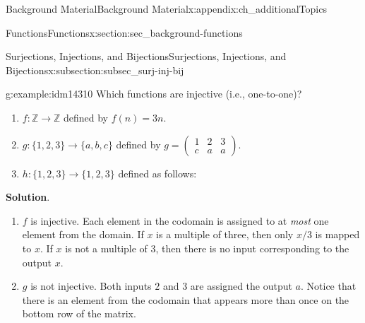 \documentclass[oneside,10pt,]{book}
\numberwithin{equation}{chapter}
\def\Z{\mathbb Z}
\newcommand{\amp}{&}
\begin{document}
\begin{appendixptx}{Background Material}{}{Background Material}{}{}{x:appendix:ch_additionalTopics}
\begin{sectionptx}{Functions}{}{Functions}{}{}{x:section:sec_background-functions}
\begin{subsectionptx}{Surjections, Injections, and Bijections}{}{Surjections, Injections, and Bijections}{}{}{x:subsection:subsec_surj-inj-bij}
\begin{sidebyside}{2}{0.05}{0.05}{0.1}
\begin{sbspanel}{0.4}%
%
\end{sbspanel}%
\end{sidebyside}%
\begin{example}{}{g:example:idm14310}%
Which functions are injective (i.e., one-to-one)?%
\par
%
\begin{enumerate}
\item{}\(f:\Z \to \Z\) defined by \(f(n) = 3n\).%
\item{}\(g: \{1,2,3\} \to \{a,b,c\}\) defined by \(g = \begin{pmatrix}1 \amp 2 \amp 3 \\ c \amp a \amp a \end{pmatrix}\).%
\item{}\(h:\{1,2,3\} \to \{1,2,3\}\) defined as follows:%
\begin{sidebyside}{1}{0.4}{0.4}{0}%
\begin{sbspanel}{0.2}%
%
\end{sbspanel}%
\end{sidebyside}%
\end{enumerate}
%
\par\smallskip%
\noindent\textbf{Solution}.\hypertarget{g:solution:idm14327}{}\quad{}%
\begin{enumerate}
\item{}\(f\) is injective. Each element in the codomain is assigned to at \emph{most} one element from the domain. If \(x\) is a multiple of three, then only \(x/3\) is mapped to \(x\). If \(x\) is not a multiple of 3, then there is no input corresponding to the output \(x\).%
\item{}\(g\) is not injective. Both inputs \(2\) and \(3\) are assigned the output \(a\). Notice that there is an element from the codomain that appears more than once on the bottom row of the matrix.%

\end{enumerate}
\end{example}
\end{subsectionptx}
\end{sectionptx}
\end{appendixptx}
\end{document}
